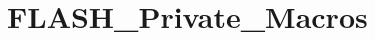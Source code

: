 \hypertarget{group___f_l_a_s_h___private___macros}{}\section{F\+L\+A\+S\+H\+\_\+\+Private\+\_\+\+Macros}
\label{group___f_l_a_s_h___private___macros}
